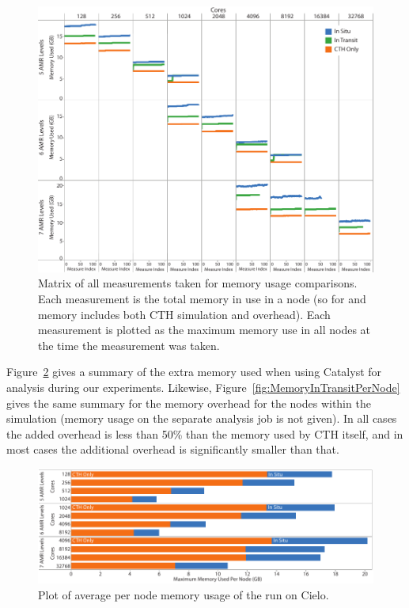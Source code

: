 \begin{figure}[htb]
  \centering
  \includegraphics[width=\linewidth]{figures/MemoryUsageAll}
  \caption[Memory usage plot matrix.]{Matrix of all measurements taken for
    memory usage comparisons.  Each measurement is the total memory in use
    in a node (so for \insitu and \intransit memory includes both CTH
    simulation and overhead).  Each measurement is plotted as the maximum
    memory use in all nodes at the time the measurement was taken.}
  \label{fig:MemoryUsageAll}
\end{figure}

Figure~\ref{fig:MemoryInSituPerNode} gives a summary of the extra memory
used when using Catalyst for \insitu analysis during our experiments.
Likewise, Figure~\ref{fig:MemoryInTransitPerNode} gives the same summary
for the \intransit memory overhead for the nodes within the simulation
(memory usage on the separate analysis job is not given).  In all cases the
added overhead is less than 50\% than the memory used by CTH itself, and in
most cases the additional overhead is significantly smaller than that.

\begin{figure}[htb]
  \centering
  \includegraphics[width=\linewidth]{figures/MemoryUsageInSituPerNode}
  \caption{Plot of average per node memory usage of the \insitu run on Cielo.}
  \label{fig:MemoryInSituPerNode}
\end{figure}

